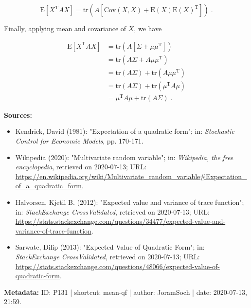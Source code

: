\documentclass[a4paper,12pt,twoside]{book}
\begin{document}
\begin{equation} \label{eq:mean-qf-mean-qf-s4}
\mathrm{E}\left[ X^\mathrm{T} A X \right] =  \mathrm{tr} \left( A \left[ \mathrm{Cov}(X,X) + \mathrm{E}(X) \mathrm{E}(X)^\mathrm{T} \right] \right) \; .
\end{equation}

Finally, applying mean and covariance of $X$, we have

\begin{equation} \label{eq:mean-qf-mean-qf-s5}
\begin{split}
\mathrm{E}\left[ X^\mathrm{T} A X \right] &= \mathrm{tr} \left( A \left[ \Sigma + \mu \mu^\mathrm{T} \right] \right) \\
&= \mathrm{tr} \left( A \Sigma + A \mu \mu^\mathrm{T} \right) \\
&= \mathrm{tr}(A \Sigma) + \mathrm{tr}(A \mu \mu^\mathrm{T}) \\
&= \mathrm{tr}(A \Sigma) + \mathrm{tr}(\mu^\mathrm{T} A \mu) \\
&= \mu^\mathrm{T} A \mu + \mathrm{tr}(A \Sigma) \; .
\end{split}
\end{equation}


\vspace{1em}
\textbf{Sources:}
\begin{itemize}
\item Kendrick, David (1981): "Expectation of a quadratic form"; in: \textit{Stochastic Control for Economic Models}, pp. 170-171.
\item Wikipedia (2020): "Multivariate random variable"; in: \textit{Wikipedia, the free encyclopedia}, retrieved on 2020-07-13; URL: \url{https://en.wikipedia.org/wiki/Multivariate_random_variable#Expectation_of_a_quadratic_form}.
\item Halvorsen, Kjetil B. (2012): "Expected value and variance of trace function"; in: \textit{StackExchange CrossValidated}, retrieved on 2020-07-13; URL: \url{https://stats.stackexchange.com/questions/34477/expected-value-and-variance-of-trace-function}.
\item Sarwate, Dilip (2013): "Expected Value of Quadratic Form"; in: \textit{StackExchange CrossValidated}, retrieved on 2020-07-13; URL: \url{https://stats.stackexchange.com/questions/48066/expected-value-of-quadratic-form}.
\end{itemize}


\vspace{1em}
\textbf{Metadata:} ID: P131 | shortcut: mean-qf | author: JoramSoch | date: 2020-07-13, 21:59.
\vspace{1em}
\end{document}
